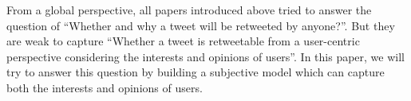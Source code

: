 \documentclass{acm_proc_article-sp}
\begin{document}
From a global perspective, all papers introduced above tried to answer the question of ``Whether and why a tweet will be retweeted by anyone?''. 
But they are weak to capture ``Whether a tweet is retweetable from a user-centric perspective considering the interests and opinions of users''. 
In this paper, we will try to answer this question by building a subjective model which can capture both the interests and opinions of users.

%
%
%
\end{document}
